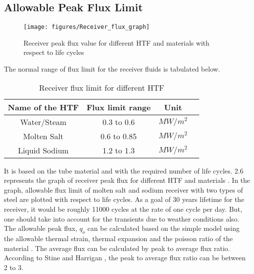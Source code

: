 \subsection{Allowable Peak Flux Limit }
\begin{figure}[h]
	\texttt{[image: figures/Receiver\_flux\_graph]}
	\centering
	\caption{Receiver peak flux value for different HTF and materials with respect to life cycles \cite{Falcone.1986}}
\end{figure}
The normal range of flux limit for the receiver fluids is tabulated below.
\begin{table}[h]
\begin{center}
	\begin{tabular}{ |c|c|c|c| } 
		\hline
		 \textbf{Name of the HTF} & \textbf{Flux limit range} & \textbf{Unit} \\
		\hline
		Water/Steam & 0.3 to 0.6 & $ MW/m^2 $ \\ 
		\hline
		Molten Salt& 0.6 to 0.85 & $ MW/m^2 $ \\ 
		\hline
		Liquid Sodium& 1.2 to 1.3 & $ MW/m^2 $ \\ 
		\hline
	\end{tabular}
	\caption{Receiver flux limit for different HTF\label{Receiver_flux_limit} \cite{Falcone.1986}}
\end{center}
\end{table}
It is based on the tube material and with the required number of life cycles. \figurename{ 2.6} represents the graph of receiver peak flux for different HTF and materials \cite{Falcone.1986}. In the graph, allowable flux limit of molten salt and sodium receiver with two types of steel are plotted with respect to life cycles. As a goal of 30 years lifetime for the receiver, it would be roughly 11000 cycles at the rate of one cycle per day. But, one should take into account for the transients due to weather conditions also. The allowable peak flux, ${q_o}$ can be calculated based on the simple model using the allowable thermal strain, thermal expansion and the poisson ratio of the material \cite{Liao.2014}. The average flux can be calculated by peak to average flux ratio. According to Stine and Harrigan \cite{Stine.1985}, the peak to average flux ratio can be between 2 to 3.
